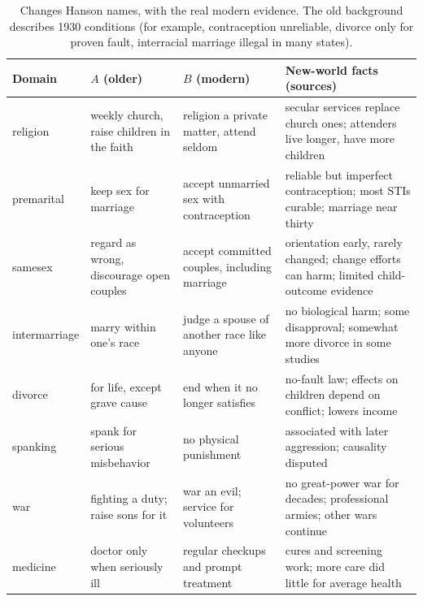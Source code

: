 \documentclass[11pt]{article}
\begin{document}
\begin{table}[!ht]
\centering\footnotesize
\begin{tabularx}{\linewidth}{@{}l>{\raggedright}X>{\raggedright}X>{\raggedright\arraybackslash}X@{}}
\toprule
Domain & $A$ (older) & $B$ (modern) & New-world facts (sources) \\
\midrule
religion & weekly church, raise children in the faith & religion a private matter, attend seldom & secular services replace church ones; attenders live longer, have more children \cite{li2016religious,hayford2008religiosity} \\
premarital & keep sex for marriage & accept unmarried sex with contraception & reliable but imperfect contraception; most STIs curable; marriage near thirty \cite{sundaram2017contraceptive,who2024sti,census2025marriage} \\
samesex & regard as wrong, discourage open couples & accept committed couples, including marriage & orientation early, rarely changed; change efforts can harm; limited child-outcome evidence \cite{bailey2016sexual,apa2009soce,perrin2013promoting} \\
intermarriage & marry within one's race & judge a spouse of another race like anyone & no biological harm; some disapproval; somewhat more divorce in some studies \cite{joshi2015directional,bratter2008interracial,zhang2009interracial} \\
divorce & for life, except grave cause & end when it no longer satisfies & no-fault law; effects on children depend on conflict; lowers income \cite{amato1995conflict,amato2000divorce} \\
spanking & spank for serious misbehavior & no physical punishment & associated with later aggression; causality disputed \cite{gershoff2016spanking,ferguson2013spanking} \\
war & fighting a duty; raise sons for it & war an evil; service for volunteers & no great-power war for decades; professional armies; other wars continue \cite{gaddis1986longpeace} \\
medicine & doctor only when seriously ill & regular checkups and prompt treatment & cures and screening work; more care did little for average health \cite{brook1983freecare,schwartz2014lowvalue} \\
\bottomrule
\end{tabularx}
\caption{Changes Hanson names, with the real modern evidence. The old background describes 1930 conditions (for example, contraception unreliable, divorce only for proven fault, interracial marriage illegal in many states).}
\label{tab:domainsD}
\end{table}
\end{document}
